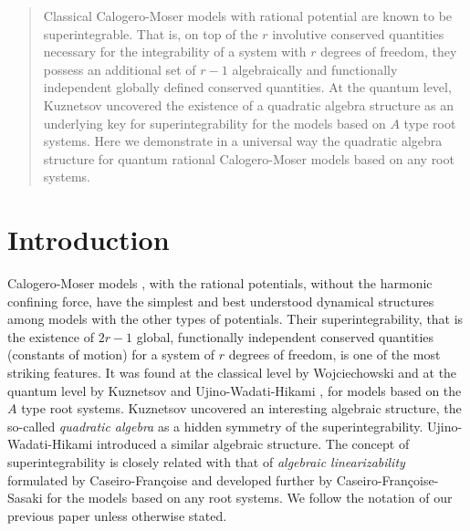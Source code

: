 \documentclass[a4paper,12pt]{article}
\begin{document}
\Author

\Address
\vspace{1cm}

\begin{abstract}
Classical Calogero-Moser models with rational potential are known to be
superintegrable. That is, on top of the
$r$ involutive conserved quantities necessary for the integrability of
a system with $r$  degrees of freedom, they possess an additional
set of  $r-1$ algebraically and functionally
independent globally defined conserved quantities.
At the quantum level, Kuznetsov uncovered the existence of
a quadratic algebra structure as an
underlying key for superintegrability for the models based on
$A$ type root systems. Here we demonstrate in a universal way
the quadratic algebra structure
for quantum rational Calogero-Moser models based on any root systems.
\end{abstract}
\bigskip
\bigskip
\bigskip

\section{Introduction}
\label{intro}
\setcounter{equation}{0}

Calogero-Moser models \cite{Cal, Sut},
\cite{CalMo} with the rational potentials, without the
harmonic confining force,
have the simplest and  best understood dynamical structures among
models with the other types of potentials.
Their superintegrability, that is the existence of
$2r-1$ global, functionally independent conserved quantities
(constants of motion) for a system of $r$ degrees of freedom,
is one of the most striking features. It was found  at the classical
level by Wojciechowski
\cite{Woj} and at the quantum level by Kuznetsov \cite{Kuz}
and Ujino-Wadati-Hikami \cite{UjWa},
for models based on the $A$ type root systems.
Kuznetsov \cite{Kuz} uncovered an interesting algebraic structure,
the so-called {\em quadratic algebra\/}
as a hidden symmetry of the superintegrability.
Ujino-Wadati-Hikami \cite{UjWa} introduced a similar algebraic structure.
The concept of superintegrability is closely related with that of
{\em algebraic linearizability\/} formulated by Caseiro-Fran\c{c}oise
\cite{cf} and developed further by Caseiro-Fran\c{c}oise-Sasaki
\cite{cfs} for the models based on any root systems.
We follow the notation of our previous paper unless otherwise stated.
\end{document}
